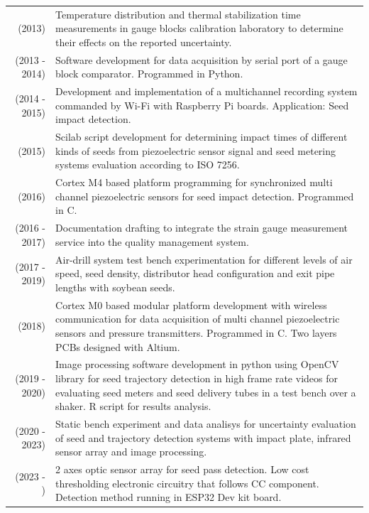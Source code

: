 \documentclass[a4paper,10pt, sans]{article}
\begin{document}
\begin{table}[H]
\begin{tabularx}{\textwidth}{r X}
        (2013) & Temperature distribution and thermal stabilization time measurements in gauge blocks calibration laboratory to determine their effects on the reported uncertainty. \\ [1ex]
        (2013 - 2014) & Software development for data acquisition by serial port of a gauge block comparator. Programmed in Python.\\ [1ex]
        (2014 - 2015) & Development and implementation of a multichannel recording system commanded by Wi-Fi with Raspberry Pi boards. Application: Seed impact detection. \\ [1ex]
        (2015) & Scilab script development for determining impact times of different kinds of seeds from piezoelectric sensor signal and seed metering systems evaluation according to ISO 7256. \\ [1ex]
        (2016) & Cortex M4 based platform programming for synchronized multi channel piezoelectric sensors for seed impact detection. Programmed in C.\\ [1ex]
        (2016 - 2017) & Documentation drafting to integrate the strain gauge measurement service into the quality management system. \\ [1ex]
        (2017 - 2019) & Air-drill system test bench experimentation for different levels of air speed, seed density, distributor head configuration and exit pipe lengths with soybean seeds. \\ [1ex]
        (2018) & Cortex M0 based modular platform development with wireless communication for data acquisition of multi channel piezoelectric sensors and pressure transmitters. Programmed in C. Two layers PCBs designed with Altium.\\ [1ex]
        (2019 - 2020) & Image processing software development in python using OpenCV library for seed trajectory detection in high frame rate videos for evaluating seed meters and seed delivery tubes in a test bench over a shaker. R script for results analysis. \\ [1ex]
        (2020 - 2023) & Static bench experiment and data analisys for uncertainty evaluation of seed and trajectory detection systems with impact plate, infrared sensor array and image processing. \\ [1ex]
        (2023 - ) & 2 axes optic sensor array for seed pass detection. Low cost thresholding electronic circuitry that follows CC component. Detection method running in ESP32 Dev kit board.\\
  \end{tabularx}
  \end{table}
\end{document}
